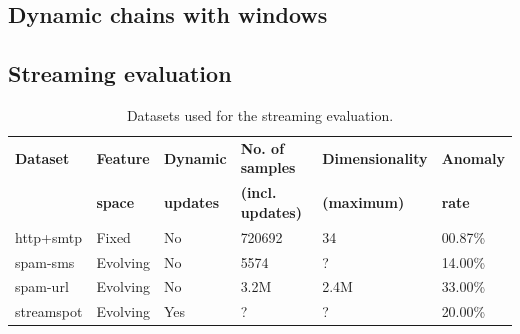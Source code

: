\documentclass[11pt,onecolumn]{article}
\begin{document}
\pagebreak

\subsection{Dynamic chains with windows}

\pagebreak

\subsection{Streaming evaluation}

\begin{table}[ht!]
	\centering
	\begin{tabular}{llllll}
	\toprule
	\textbf{Dataset} & \textbf{Feature} & \textbf{Dynamic} & \textbf{No. of samples} 	& \textbf{Dimensionality} & \textbf{Anomaly}\\
									 & \textbf{space}   & \textbf{updates} & \textbf{(incl. updates)} & \textbf{(maximum)} 			& \textbf{rate}\\
	\midrule
	http+smtp 			 & Fixed 	  		    & No				 & 720692 & 34   & 00.87\%\\
 	spam-sms 			 	 & Evolving 			  & No				 & 5574 	& ? 	 & 14.00\%\\
 	spam-url 			 	 & Evolving 				& No				 & 3.2M   & 2.4M & 33.00\%\\
	streamspot 			 & Evolving 				& Yes				 & ?      & ?    & 20.00\%\\
	\bottomrule
	\end{tabular}
	\caption{Datasets used for the streaming evaluation.}
	\label{table:datasets}
\end{table}

\pagebreak





\printbibliography
\end{document}
